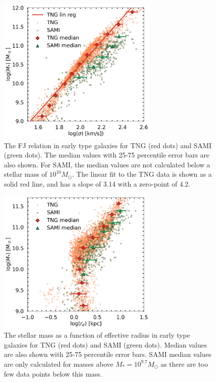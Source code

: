 \begin{figure}
    \centering
    \includegraphics[width=0.7\textwidth]{images/results_faber_jackson.png}
    \caption{The FJ relation in early type galaxies for TNG (red dots) and SAMI (green dots). The median values with 25-75 percentile error bars are also shown. For SAMI, the median values are not calculated below a stellar mass of $10^10 M_\odot$. The linear fit to the TNG data is shown as a solid red line, and has a slope of 3.14 with a zero-point of 4.2.}
    \label{FJ_res}
\end{figure}

\begin{figure}
    \centering
    \includegraphics[width=0.7\textwidth]{images/results_mass_radius_FP.png}
    \caption{The stellar mass as a function of effective radius in early type galaxies for TNG (red dots) and SAMI (green dots). Median values are also shown with 25-75 percentile error bars. SAMI median values are only calculated for masses above $M_* = 10^{9.7} M_\odot$ as there are too few data points below this mass.}
    \label{FP_res1}
\end{figure}

